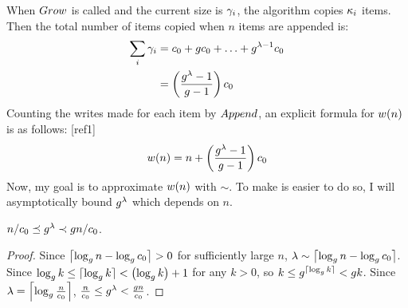 When $Grow$ is called and the current size is $\gamma_i$, the algorithm copies $\kappa_i$ items. Then the total number of items copied when $n$ items are appended is:
\begin{align*}
\sum_i {\gamma_i} &= c_0 + gc_0 + \ldots + g^{\lambda - 1}c_0\\
&= \left( \frac{g^{\lambda} - 1}{g - 1} \right) c_0
\end{align*}
Counting the writes made for each item by $Append$, an explicit formula for $w(n)$ is as follows:
[ref1]
\begin{align*}
w(n) = n + \left( \frac{g^\lambda - 1}{g - 1} \right) c_0
\end{align*}
Now, my goal is to approximate $w(n)$ with $\sim$. To make is easier to do so, I will asymptotically bound $g^\lambda$ which depends on $n$.

\begin{lemma}
	$n / c_0 \preceq g^\lambda \prec g{n} / c_0$.
\end{lemma}

\begin{proof}
	Since $\left\lceil \log_{g} n - \log_{g} c_0 \right\rceil > 0$ for sufficiently large $n$, $\lambda \sim \left\lceil \log_{g} n - \log_{g} c_0 \right\rceil$. %
	Since $\log_{g} k \leq \lceil \log_{g} k \rceil < \left( \log_{g} k \right) + 1$ for any $k > 0$, so $k \leq g^{\lceil \log_{g} k \rceil} < g{k}$. Since $\lambda = \left\lceil \log_{g} \frac{n}{c_0} \right\rceil$, $\frac n {c_0} \leq g^\lambda < \frac {g{n}} {c_0}$.
\end{proof}

